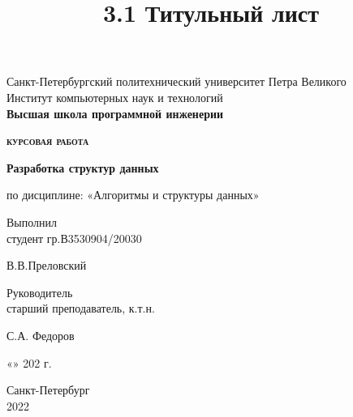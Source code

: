 
\title{3.1 Титульный лист}


\thispagestyle{empty}	%

\begin{center}
	Санкт-Петербургский политехнический университет Петра Великого\\
	Институт компьютерных наук и технологий\\
	\bfseries{Высшая школа программной инженерии}
\end{center}

\vspace{20ex} %

\begin{center}
	\begin{huge} {\bfseries{\scshape курсовая работа}} \end{huge}

	\vspace{3ex}

	{\bfseries Разработка структур данных}

	по дисциплине: «Алгоритмы и структуры данных»
\end{center}

\vspace{30ex}

\noindent Выполнил\\
студент гр.В3530904/20030\hfill \begin{minipage}{0.6\textwidth} \hfill В.В.Преловский\end{minipage}

\vspace{3ex}

\noindent Руководитель\\
старший преподаватель, к.т.н.\hfill \begin{minipage} {0.6\textwidth}\hfill С.А. Федоров\end{minipage}

\vspace{3ex}

\hfill \begin{minipage}{0.6\textwidth} \hfill «\underline{\hspace{1cm}}»\underline{\hspace{3cm}} 202\underline{\hspace{0.5cm}} г.\end{minipage}

\vfill

\begin{center}
	Санкт-Петербург\\ 
	2022
\end{center}

